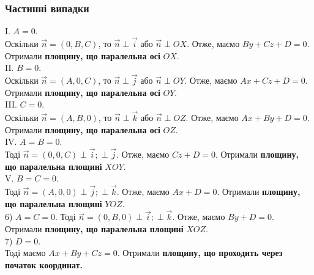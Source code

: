 \documentclass[a4paper, 10pt]{extarticle}
\theoremstyle{theoremdd}
\theoremstyle{theoremdd}
\theoremstyle{theoremdd}
\theoremstyle{theoremdd}
\theoremstyle{theoremdd}
\theoremstyle{theoremdd}
\theoremstyle{theoremdd}
\theoremstyle{theoremdd}
\begin{document}
\subsubsection*{Частинні випадки}
I. $A = 0$.\\
Оскільки $\vec{n} = (0,B,C)$, то $\vec{n} \perp \vec{i}$ або $\vec{n} \perp OX$. Отже, маємо $By + Cz + D = 0$. Отримали \textbf{площину, що паралельна осі} $OX$.
\bigskip \\
II. $B = 0$.\\
Оскільки $\vec{n} = (A,0,C)$, то $\vec{n} \perp \vec{j}$ або $\vec{n} \perp OY$. Отже, маємо $Ax + Cz + D = 0$. Отримали \textbf{площину, що паралельна осі} $OY$.
\bigskip \\
III. $C = 0$.\\
Оскільки $\vec{n} = (A,B,0)$, то $\vec{n} \perp \vec{k}$ або $\vec{n} \perp OZ$. Отже, маємо $Ax + By + D = 0$. Отримали \textbf{площину, що паралельна осі} $OZ$.
\bigskip \\
IV. $A=B=0$.\\
Тоді $\vec{n} = (0,0,C) \perp \vec{i}; \perp \vec{j}$. Отже, маємо $Cz + D = 0$. Отримали \textbf{площину, що паралельна площині} $XOY$.
\bigskip \\
V. $B=C=0$.\\
Тоді $\vec{n} = (A,0,0) \perp \vec{j}; \perp \vec{k}$. Отже, маємо $Ax + D = 0$. Отримали \textbf{площину, що паралельна площині} $YOZ$.
\bigskip \\
6) $A=C=0$.
Тоді $\vec{n} = (0,B,0) \perp \vec{i}; \perp \vec{k}$. Отже, маємо $By + D = 0$. Отримали \textbf{площину, що паралельна площині} $XOZ$.
\bigskip \\
7) $D = 0$.\\
Тоді маємо $Ax + By + Cz = 0$. Отримали \textbf{площину, що проходить через початок координат.}
\end{document}
